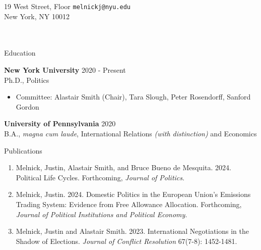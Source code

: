 \documentclass{resume} %
\begin{document}
19 West  Street,  Floor \hfill \texttt{melnickj@nyu.edu}\\
New York, NY 10012 \hfill \texttt{\href{justinmelnick.github.io}{}} \\\\\\
\begin{rSection}{Education}

{\bf New York University} \hfill { 2020 - Present} \\
Ph.D., Politics 
\begin{itemize}
    \item Committee: Alastair Smith (Chair), Tara Slough, Peter Rosendorff, Sanford Gordon
\end{itemize}
\vspace*{0.075in}

{\bf University of Pennsylvania} \hfill { 2020} 
\\B.A., \emph{magna cum laude}, International Relations \emph{(with distinction)} and Economics


\end{rSection}

\begin{rSection}{Publications}

\begin{enumerate}
 \item Melnick, Justin, Alastair Smith, and Bruce Bueno de Mesquita. 2024. Political Life Cycles. Forthcoming, \textit{Journal of Politics}.
\item Melnick, Justin. 2024. Domestic Politics in the European Union’s Emissions Trading System: Evidence from Free Allowance Allocation. Forthcoming, \textit{Journal of Political Institutions and Political Economy}.
    \item Melnick, Justin and Alastair Smith. 2023. International Negotiations in the Shadow of Elections.  \textit{Journal of Conflict Resolution} 67(7-8): 1452-1481.
\end{enumerate}

\end{rSection}
\end{document}
